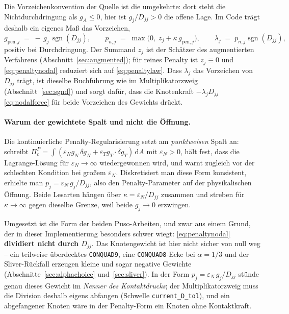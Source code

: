 \documentclass[a4paper,11pt]{article}
\def\bm#1{#1}%
\def\tfrac#1#2{#1/#2}%
\def\tilde#1{#1}%
\newcommand{\code}[1]{\texttt{\small #1}}
\begin{document}
Die Vorzeichenkonvention der Quelle ist die umgekehrte: dort steht die Nichtdurchdringung als
$g_A\le0$, hier ist $\tilde g_j/\tilde D_{jj}>0$ die offene Lage. Im Code trägt deshalb ein
eigenes Maß das Vorzeichen,
\begin{equation}
g_{\text{pen},j} \;=\; -\,\tilde g_j\,\operatorname{sgn}(\tilde D_{jj}),
\qquad
p_{n,j} \;=\; \max\bigl(0,\;z_j + \kappa\,g_{\text{pen},j}\bigr),
\qquad
\lambda_j \;=\; p_{n,j}\operatorname{sgn}(\tilde D_{jj}),
\label{eq:penaltynodal}
\end{equation}
positiv bei Durchdringung. Der Summand $z_j$ ist der Schätzer des augmentierten Verfahrens
(Abschnitt~\ref{sec:augmented}); für reines Penalty ist $z_j\equiv0$ und \eqref{eq:penaltynodal}
reduziert sich auf \eqref{eq:penaltylaw}. Dass $\lambda_j$ das Vorzeichen von $\tilde D_{jj}$
trägt, ist dieselbe Buchführung wie im Multiplikatorzweig (Abschnitt~\ref{sec:sgnd}) und sorgt
dafür, dass die Knotenkraft $-\lambda_j\tilde D_{jj}$ \eqref{eq:nodalforce} für beide Vorzeichen
des Gewichts drückt.

\paragraph{Warum der gewichtete Spalt und nicht die Öffnung.}
Die kontinuierliche Penalty-Regularisierung setzt am \emph{punktweisen} Spalt an:
\citet[Gl.~(30)/(31)]{wriggers} schreibt
$\Pi^P_c=\int(\varepsilon_N g_N\,\delta g_N+\varepsilon_T\bm g_T\!\cdot\!\delta\bm g_T)\,\mathrm dA$
mit $\varepsilon_N>0$, hält fest, dass die Lagrange-Lösung für $\varepsilon_N\to\infty$
wiedergewonnen wird, und warnt zugleich vor der schlechten Kondition bei großem
$\varepsilon_N$. Diskretisiert man diese Form konsistent, erhielte man
$p_j=\varepsilon_N\,\tilde g_j/\tilde D_{jj}$, also den Penalty-Parameter auf der physikalischen
Öffnung. Beide Lesarten hängen über $\kappa=\varepsilon_N/\tilde D_{jj}$ zusammen und streben für
$\kappa\to\infty$ gegen dieselbe Grenze, weil beide $\tilde g_j\to0$ erzwingen.

Umgesetzt ist die Form der beiden Puso-Arbeiten, und zwar aus einem Grund, der in dieser
Implementierung besonders schwer wiegt: \eqref{eq:penaltynodal} \textbf{dividiert nicht durch
$\tilde D_{jj}$}. Das Knotengewicht ist hier nicht sicher von null weg -- ein teilweise
überdecktes \code{CONQUAD9}, eine \code{CONQUAD8}-Ecke bei $\alpha=\tfrac13$ und der
Sliver-Rückfall erzeugen kleine und sogar negative Gewichte (Abschnitte~\ref{sec:alphachoice}
und~\ref{sec:sliver}). In der Form $p_j=\varepsilon_N\,\tilde g_j/\tilde D_{jj}$ stünde genau
dieses Gewicht im \emph{Nenner des Kontaktdrucks}; der Multiplikatorzweig muss die Division
deshalb eigens abfangen (Schwelle \code{current\_D\_tol}), und ein abgefangener Knoten wäre in der
Penalty-Form ein Knoten ohne Kontaktkraft.
\end{document}
